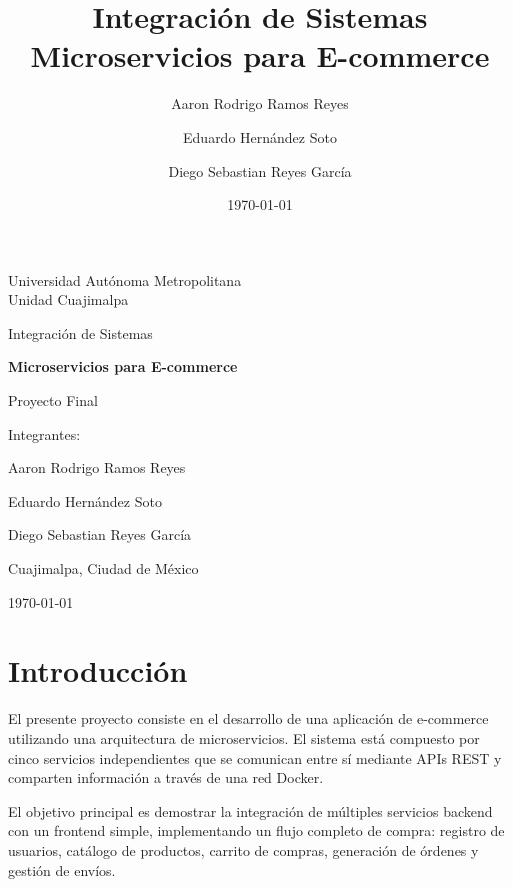 \documentclass[11pt,a4paper]{article}
\title{Integración de Sistemas \\ Microservicios para E-commerce}
\author{Aaron Rodrigo Ramos Reyes}
\author{Eduardo Hernández Soto}
\author{Diego Sebastian Reyes García}
\date{\today}
\begin{document}
\begin{titlepage}
    \centering
    \vspace*{2cm}
    
    {\Large Universidad Autónoma Metropolitana \\ Unidad Cuajimalpa \par}
    \vspace{1.5cm}
    
    {\Large Integración de Sistemas \par}
    \vspace{2cm}
    
    {\Huge \textbf{Microservicios para E-commerce} \par}
    \vspace{1.5cm}
    
    {\large Proyecto Final \par}
    \vspace{2cm}
    
    {\large Integrantes: \par}
    {\Large Aaron Rodrigo Ramos Reyes \par}
    {\Large Eduardo Hernández Soto \par}
    {\Large Diego Sebastian Reyes García \par}
    \vspace{1.5cm}
    
    
    
    {\large Cuajimalpa, Ciudad de México \par}
    {\large \today \par}
\end{titlepage}

\tableofcontents
\newpage

\section{Introducción}
El presente proyecto consiste en el desarrollo de una aplicación de e-commerce utilizando una arquitectura de microservicios. El sistema está compuesto por cinco servicios independientes que se comunican entre sí mediante APIs REST y comparten información a través de una red Docker.

El objetivo principal es demostrar la integración de múltiples servicios backend con un frontend simple, implementando un flujo completo de compra: registro de usuarios, catálogo de productos, carrito de compras, generación de órdenes y gestión de envíos.
\end{document}

